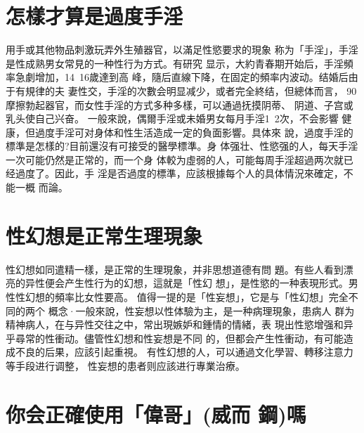 \documentclass[12pt,UTF8]{ctexbook}
\begin{document}
\section{怎樣才算是過度手淫}

用手或其他物品刺激玩弄外生殖器官，以滿足性慾要求的現象
称为「手淫」，手淫是性成熟男女常見的一种性行为方式。有研究
显示，大約青春期开始后，手淫頻率急劇增加，14~16歲達到高
峰，隨后直線下降，在固定的頻率内波动。结婚后由于有規律的夫
妻性交，手淫的次數会明显减少，或者完全終结，但總体而言，
90%
摩擦勃起器官，而女性手淫的方式多种多樣，可以通過抚摸阴蒂、
阴道、子宫或乳头使自己兴奋。
一般來說，偶爾手淫或未婚男女每月手淫1~2次，不会影響
健康，但過度手淫可对身体和性生活造成一定的負面影響。具体來
說，過度手淫的標準是怎樣的?目前還沒有可接受的醫學標準。身
体强壮、性慾强的人，每天手淫一次可能仍然是正常的，而一个身
体較为虛弱的人，可能每周手淫超過两次就已经過度了。因此，手
淫是否過度的標準，应該根據每个人的具体情況來確定，不能一概
而論。
\section{性幻想是正常生理現象}
性幻想如同遣精一樣，是正常的生理現象，并非思想道德有問
題。有些人看到漂亮的异性便会产生性行为的幻想，這就是「性幻
想」，是性慾的一种表現形式。男性性幻想的頻率比女性要高。
值得一提的是「性妄想」，它是与「性幻想」完全不同的两个
概念·一般來說，性妄想以性体驗为主，是一种病理現象，患病人
群为精神病人，在与异性交往之中，常出現嫉妒和鍾情的情緒，表
現出性慾增强和异乎尋常的性衝动。儘管性幻想和性妄想是不同
的，但都会产生性衝动，有可能造成不良的后果，应該引起重視。
有性幻想的人，可以通過文化學習、轉移注意力等手段进行调整，
性妄想的患者则应該进行專業治療。

\section{你会正確使用「偉哥」(威而
鋼)嗎}
\end{document}
